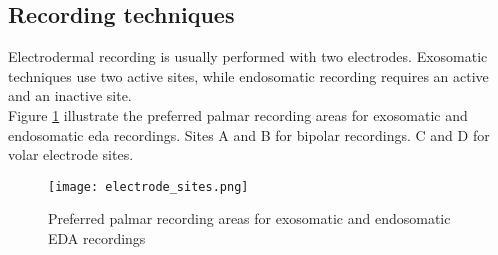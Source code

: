 \subsection{Recording techniques}
Electrodermal recording is usually performed with two electrodes. Exosomatic techniques use two active sites, while endosomatic recording requires an active and an inactive site.
\\
Figure \ref{fig:electrode_sites} illustrate the preferred palmar recording areas for exosomatic and endosomatic \gls{eda} recordings. Sites A and B for bipolar recordings. C and D for volar electrode sites.
\begin{figure}[h]
    \centering
    \texttt{[image: electrode\_sites.png]} 
	\caption{Preferred palmar recording areas for exosomatic and endosomatic EDA recordings}
    \label{fig:electrode_sites}
\end{figure}

